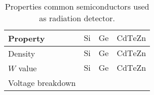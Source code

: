 \begin{table}[ht]
	\centering
	\caption[]{Properties common semiconductors used as radiation detector.}
	\label{chap3:semiconductor}
	\begin{tabular}{llll}
    \toprule
    Property & $\mathrm{Si}$ & $\mathrm{Ge}$ & $\mathrm{CdTeZn}$ \\
    \midrule
    Density & $\mathrm{Si}$ & $\mathrm{Ge}$ & $\mathrm{CdTeZn}$ \\
    $W$ value & $\mathrm{Si}$ & $\mathrm{Ge}$ & $\mathrm{CdTeZn}$ \\
    Voltage breakdown & $\mathrm{}$ & & \\
		\bottomrule
	\end{tabular}
\end{table}